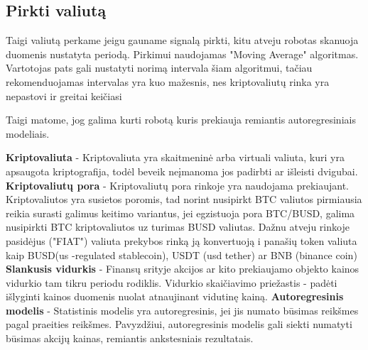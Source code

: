 \documentclass{VUMIFInfKursinis}
\begin{document}
\subsection{Pirkti valiutą}
Taigi valiutą perkame jeigu gauname signalą pirkti, kitu atveju robotas skanuoja duomenis nustatyta periodą. Pirkimui naudojamas "Moving Average" algoritmas. 
Vartotojas pats gali nustatyti norimą intervala šiam algoritmui, tačiau rekomenduojamas intervalas yra kuo mažesnis, nes kriptovaliutų rinka 
yra nepastovi ir greitai keičiasi 




Taigi matome, jog galima kurti robotą kuris prekiauja remiantis autoregresiniais modeliais.

\textbf{Kriptovaliuta} - Kriptovaliuta yra skaitmeninė arba virtuali valiuta, kuri yra apsaugota kriptografija, todėl beveik neįmanoma jos padirbti ar išleisti dvigubai.
\textbf{Kriptovaliutų pora} - Kriptovaliutų pora rinkoje yra naudojama prekiaujant. Kriptovaliutos yra susietos poromis, tad norint nusipirkt BTC valiutos pirmiausia reikia surasti 
galimus keitimo variantus, jei egzistuoja pora BTC/BUSD, galima nusipirkti BTC kriptovaliutos uz turimas BUSD valiutas. Dažnu atveju rinkoje pasidėjus ("FIAT") valiuta
prekybos rinką ją konvertuoją i panašių token valiuta kaip BUSD(us -regulated stablecoin), USDT (usd tether) ar BNB (binance coin)
\textbf{Slankusis vidurkis} - Finansų srityje akcijos ar kito prekiaujamo objekto kainos vidurkio tam tikru periodu rodiklis. Vidurkio skaičiavimo priežastis - padėti išlyginti
kainos duomenis nuolat atnaujinant vidutinę kainą.
\textbf{Autoregresinis modelis} - Statistinis modelis yra autoregresinis, jei jis numato būsimas reikšmes pagal praeities reikšmes. Pavyzdžiui, autoregresinis modelis gali
siekti numatyti būsimas akcijų kainas, remiantis ankstesniais rezultatais.

\printbibliography[heading=bibintoc] %
\end{document}

